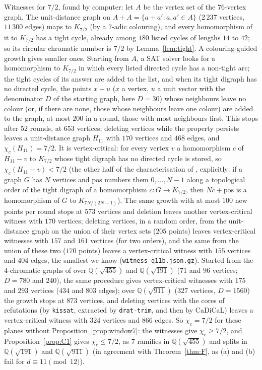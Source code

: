 \documentclass[11pt,a4paper]{amsart}
\theoremstyle{remark}
\newcommand{\Q}{\mathbb{Q}}
\begin{document}
Witnesses for $7/2$, found by computer: let $A$ be
the vertex set of the $76$-vertex graph. The unit-distance graph on $A+A=\{a+a':a,a'\in A\}$ ($2\,237$ vertices,
$11\,300$ edges) maps to $K_{7/2}$ (by a $7$-adic colouring), and every homomorphism of it to $K_{7/2}$ has a tight
cycle, already among $180$ listed cycles of lengths $14$ to $42$; so its circular chromatic number is $7/2$ by
Lemma~\ref{lem:tight}. A colouring-guided growth gives smaller ones. Starting from $A$, a SAT solver looks for a
homomorphism to $K_{7/2}$ in which every listed directed cycle has a non-tight arc; the tight cycles of its answer
are added to the list, and when its tight digraph has no directed cycle, the points $x+u$ ($x$ a vertex, $u$ a unit
vector with the denominator $D$ of the starting graph, here $D=30$) whose neighbours leave no colour (or, if there are
none, those whose neighbours leave one colour) are added to the graph, at most $200$ in a round, those with most
neighbours first. This stops after $52$
rounds, at $653$ vertices; deleting vertices while the property persists leaves a unit-distance graph $H_{11}$ with
$170$ vertices and $468$ edges, and $\chi_c(H_{11})=7/2$. It is vertex-critical: for every vertex $v$ a homomorphism
$c$ of $H_{11}-v$ to $K_{7/2}$ whose tight digraph has no directed cycle is stored, so $\chi_c(H_{11}-v)<7/2$ (the
other half of the characterisation of \cite{Guichard}, explicitly: if a graph $G$ has $N$ vertices and
$\mathrm{pos}$ numbers them $0,\dots,N-1$ along a topological order of the tight digraph of a homomorphism
$c\colon G\to K_{7/2}$, then $Nc+\mathrm{pos}$ is a homomorphism of $G$ to $K_{7N/(2N+1)}$). The same growth with
at most $100$ new points per round stops at $573$ vertices and deletion leaves another vertex-critical witness with
$170$ vertices; deleting vertices, in a random order, from the unit-distance graph on the union of their vertex sets
($205$ points) leaves vertex-critical witnesses with $157$ and $161$ vertices (for two orders), and the same from the
union of these two ($170$ points) leaves a vertex-critical witness with $155$ vertices and $404$ edges, the smallest
we know (\nolinkurl{witness_q11b.json.gz}). Started from the
$4$-chromatic graphs of \cite{Repo} over $\Q(\sqrt{455})$ and $\Q(\sqrt{191})$ ($71$ and $96$ vertices; $D=780$ and
$240$), the same procedure gives vertex-critical witnesses with $175$ and $293$ vertices ($434$ and $803$ edges);
over $\Q(\sqrt{911})$ ($327$ vertices, $D=1560$) the growth stops at $873$ vertices, and deleting vertices with the
cores of refutations (by \texttt{kissat}, extracted by \texttt{drat-trim}, and then by CaDiCaL) leaves a vertex-critical
witness with $324$ vertices and $866$ edges. So
$\chi_c=7/2$ for these planes without Proposition~\ref{prop:window7}: the witnesses give $\chi_c\ge7/2$, and
Proposition~\ref{prop:C1} gives $\chi_c\le7/2$, as $7$ ramifies in $\Q(\sqrt{455})$ and splits in $\Q(\sqrt{191})$
and $\Q(\sqrt{911})$
(in agreement with Theorem~\ref{thm:F}, as (a) and (b) fail for $d\equiv11\pmod{12}$).
\end{document}
